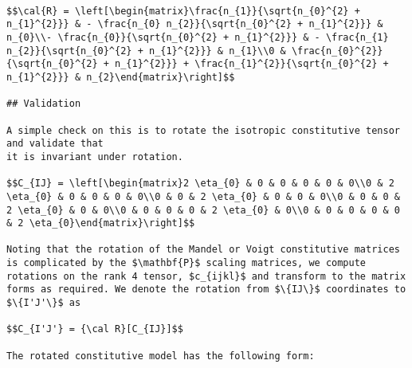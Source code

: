 \documentclass[
  letterpaper,
  DIV=11,
  numbers=noendperiod]{scrreprt}
\begin{document}
\begin{verbatim}

$$\cal{R} = \left[\begin{matrix}\frac{n_{1}}{\sqrt{n_{0}^{2} + n_{1}^{2}}} & - \frac{n_{0} n_{2}}{\sqrt{n_{0}^{2} + n_{1}^{2}}} & n_{0}\\- \frac{n_{0}}{\sqrt{n_{0}^{2} + n_{1}^{2}}} & - \frac{n_{1} n_{2}}{\sqrt{n_{0}^{2} + n_{1}^{2}}} & n_{1}\\0 & \frac{n_{0}^{2}}{\sqrt{n_{0}^{2} + n_{1}^{2}}} + \frac{n_{1}^{2}}{\sqrt{n_{0}^{2} + n_{1}^{2}}} & n_{2}\end{matrix}\right]$$

## Validation

A simple check on this is to rotate the isotropic constitutive tensor and validate that
it is invariant under rotation. 

$$C_{IJ} = \left[\begin{matrix}2 \eta_{0} & 0 & 0 & 0 & 0 & 0\\0 & 2 \eta_{0} & 0 & 0 & 0 & 0\\0 & 0 & 2 \eta_{0} & 0 & 0 & 0\\0 & 0 & 0 & 2 \eta_{0} & 0 & 0\\0 & 0 & 0 & 0 & 2 \eta_{0} & 0\\0 & 0 & 0 & 0 & 0 & 2 \eta_{0}\end{matrix}\right]$$

Noting that the rotation of the Mandel or Voigt constitutive matrices is complicated by the $\mathbf{P}$ scaling matrices, we compute rotations on the rank 4 tensor, $c_{ijkl}$ and transform to the matrix forms as required. We denote the rotation from $\{IJ\}$ coordinates to $\{I'J'\}$ as

$$C_{I'J'} = {\cal R}[C_{IJ}]$$

The rotated constitutive model has the following form:


\end{verbatim}
\end{document}

